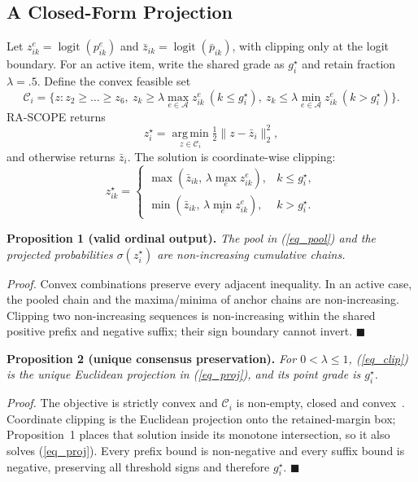 \documentclass[conference]{IEEEtran}
\begin{document}
\subsection{A Closed-Form Projection}
Let $z_{ik}^{e} = \operatorname{logit}(p_{ik}^{e})$ and
$\bar{z}_{ik} = \operatorname{logit}(\bar{p}_{ik})$, with clipping only at the
logit boundary. For an active item, write the shared grade as $g_i^{\star}$ and
retain fraction $\lambda = .5$. Define the convex feasible set
\begin{equation}
\mathcal{C}_i = \Big\{ z : z_2 \ge \dots \ge z_6, \
z_k \ge \lambda \max_{e \in \mathcal{A}} z_{ik}^{e}\ (k \le g_i^{\star}), \
z_k \le \lambda \min_{e \in \mathcal{A}} z_{ik}^{e}\ (k > g_i^{\star}) \Big\}.
\end{equation}
RA-SCOPE returns
\begin{equation}
z_i^{\star} = \operatorname*{arg\,min}_{z \in \mathcal{C}_i}
\tfrac{1}{2}\lVert z - \bar{z}_i \rVert_2^2,
\label{eq_proj}
\end{equation}
and otherwise returns $\bar{z}_i$. The solution is coordinate-wise clipping:
\begin{equation}
z_{ik}^{\star} =
\begin{cases}
\max\!\left(\bar{z}_{ik},\, \lambda \max_{e} z_{ik}^{e}\right), & k \le g_i^{\star},\\[2pt]
\min\!\left(\bar{z}_{ik},\, \lambda \min_{e} z_{ik}^{e}\right), & k > g_i^{\star}.
\end{cases}
\label{eq_clip}
\end{equation}

\noindent\textbf{Proposition 1 (valid ordinal output).} \emph{The pool in
(\ref{eq_pool}) and the projected probabilities
$\sigma(z_i^{\star})$ are non-increasing cumulative chains.}

\noindent\emph{Proof.} Convex combinations preserve every adjacent inequality.
In an active case, the pooled chain and the maxima/minima of anchor chains are
non-increasing. Clipping two non-increasing sequences is non-increasing within
the shared positive prefix and negative suffix; their sign boundary cannot
invert. \hfill$\blacksquare$

\noindent\textbf{Proposition 2 (unique consensus preservation).} \emph{For
$0 < \lambda \le 1$, (\ref{eq_clip}) is the unique Euclidean projection in
(\ref{eq_proj}), and its point grade is $g_i^{\star}$.}

\noindent\emph{Proof.} The objective is strictly convex and $\mathcal{C}_i$ is
non-empty, closed and convex~\cite{boyd2004convex}. Coordinate clipping is the
Euclidean projection onto the retained-margin box; Proposition~1 places that
solution inside its monotone intersection, so it also solves
(\ref{eq_proj}). Every prefix bound is non-negative and every suffix bound is
negative, preserving all threshold signs and therefore $g_i^{\star}$.
\hfill$\blacksquare$
\end{document}
